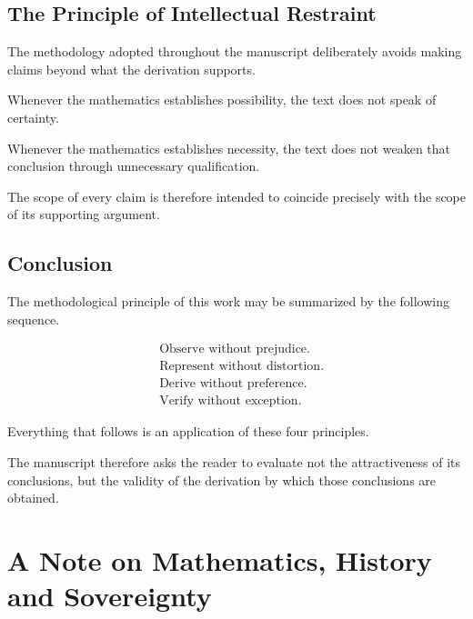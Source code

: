 \documentclass[11pt,openany]{book}
\theoremstyle{plain}
\theoremstyle{definition}
\begin{document}

\section*{The Principle of Intellectual Restraint}

The methodology adopted throughout the manuscript deliberately avoids making claims beyond what the derivation supports.

Whenever the mathematics establishes possibility, the text does not speak of certainty.

Whenever the mathematics establishes necessity, the text does not weaken that conclusion through unnecessary qualification.

The scope of every claim is therefore intended to coincide precisely with the scope of its supporting argument.


\section*{Conclusion}

The methodological principle of this work may be summarized by the following sequence.

\[
\boxed{
\begin{aligned}
&\text{Observe without prejudice.}\\[0.3em]
&\text{Represent without distortion.}\\[0.3em]
&\text{Derive without preference.}\\[0.3em]
&\text{Verify without exception.}
\end{aligned}
}
\]

Everything that follows is an application of these four principles.

The manuscript therefore asks the reader to evaluate not the attractiveness of its conclusions, but the validity of the derivation by which those conclusions are obtained.

\chapter*{A Note on Mathematics, History and Sovereignty}

\end{document}
